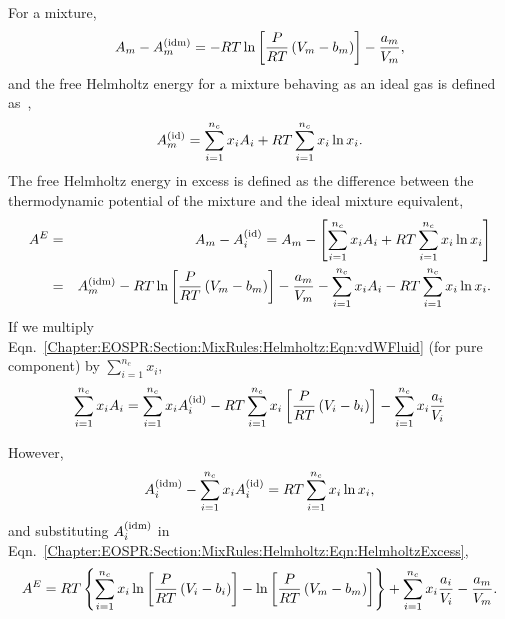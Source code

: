 For a mixture,
   \begin{equation}
      A_{m} - \mfr[A]{m}{\text{idm}} = -RT\ln{\left[\frc{P}{RT}\left(V_{m}-b_{m}\right)\right] - \frc{a_{m}}{V_{m}}},\label{Chapter:EOSPR:Section:MixRules:Helmholtz:Eqn:vdWFluid2}
   \end{equation}
and the free Helmholtz energy for a mixture behaving as an ideal gas is defined as~\citep{Sandler_Book},
   \begin{equation}
      \mfr[A]{m}{\text{id}} = \summation_{i=1}^{n_{c}} x_{i}A_{i} + RT\summation_{i=1}^{n_{c}}x_{i}\ln{x_{i}}.
   \end{equation}
 The free Helmholtz energy in excess is defined as the difference between the thermodynamic potential of the mixture and the ideal mixture equivalent,
   \begin{eqnarray}
      A^{E} &=& A_{m} - \mfr[A]{i}{\text{id}} = A_{m} - \left[\summation_{i=1}^{n_{c}} x_{i}A_{i} + RT\summation_{i=1}^{n_{c}}x_{i}\ln{x_{i}}\right] \nonumber \\
           &=& \mfr[A]{m}{\text{idm}} - RT\ln{\left[\frc{P}{RT}\left(V_{m}-b_{m}\right)\right] - \frc{a_{m}}{V_{m}}} - \summation_{i=1}^{n_{c}} x_{i}A_{i} - RT\summation_{i=1}^{n_{c}}x_{i}\ln{x_{i}}.\label{Chapter:EOSPR:Section:MixRules:Helmholtz:Eqn:HelmholtzExcess}
   \end{eqnarray}
If we multiply Eqn.~\ref{Chapter:EOSPR:Section:MixRules:Helmholtz:Eqn:vdWFluid} (for pure component) by $\sum\limits_{i=1}^{n_{c}}x_{i}$,
   \begin{equation}
      \sum\limits_{i=1}^{n_{c}}x_{i}A_{i} = \sum\limits_{i=1}^{n_{c}}x_{i}\mfr[A]{i}{\text{id}} - RT\sum\limits_{i=1}^{n_{c}}x_{i}\left[\frc{P}{RT}\left(V_{i}-b_{i}\right)\right] - \sum\limits_{i=1}^{n_{c}}x_{i}\frc{a_{i}}{V_{i}}
   \end{equation}

However,
   \begin{equation}
      \mfr[A]{i}{\text{idm}} - \sum\limits_{i=1}^{n_{c}}x_{i}\mfr[A]{i}{\text{id}} = RT\sum\limits_{i=1}^{n_{c}}x_{i}\ln{x_{i}},
   \end{equation}
and substituting $\mfr[A]{i}{\text{idm}}$ in Eqn.~\ref{Chapter:EOSPR:Section:MixRules:Helmholtz:Eqn:HelmholtzExcess},
   \begin{equation}
      A^{E} = RT\left\{ \sum\limits_{i=1}^{n_{c}}x_{i}\ln{\left[\frc{P}{RT}\left(V_{i}-b_{i}\right)\right]} - \ln{\left[\frc{P}{RT}\left(V_{m}-b_{m}\right)\right]}\right\} + \sum\limits_{i=1}^{n_{c}}x_{i}\frc{a_{i}}{V_{i}} - \frc{a_{m}}{V_{m}}.\label{Chapter:EOSPR:Section:MixRules:Helmholtz:Eqn:HelmholtzExcess2}
   \end{equation}

